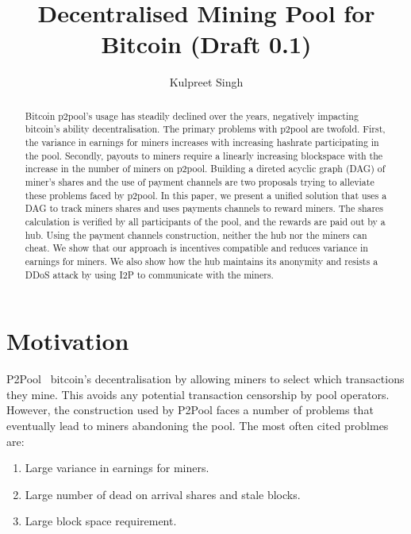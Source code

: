 \documentclass{article}
\title{Decentralised Mining Pool for Bitcoin (Draft 0.1)}
\author{Kulpreet Singh}
\date{}
\begin{document}
\maketitle

\begin{abstract}
  Bitcoin p2pool's usage has steadily declined over the years,
  negatively impacting bitcoin's ability decentralisation. The primary
  problems with p2pool are twofold. First, the variance in earnings
  for miners increases with increasing hashrate participating in the
  pool. Secondly, payouts to miners require a linearly increasing
  blockspace with the increase in the number of miners on
  p2pool. Building a direted acyclic graph (DAG) of miner's shares and
  the use of payment channels are two proposals trying to alleviate
  these problems faced by p2pool. In this paper, we present a unified
  solution that uses a DAG to track miners shares and uses payments
  channels to reward miners. The shares calculation is verified by all
  participants of the pool, and the rewards are paid out by a
  hub. Using the payment channels construction, neither the hub nor
  the miners can cheat. We show that our approach is incentives
  compatible and reduces variance in earnings for miners. We also show
  how the hub maintains its anonymity and resists a DDoS attack by
  using I2P to communicate with the miners.
\end{abstract}
   
\section{Motivation}

P2Pool~\cite{p2pool:wiki} bitcoin's decentralisation by allowing
miners to select which transactions they mine. This avoids any
potential transaction censorship by pool operators. However, the
construction used by P2Pool faces a number of problems that eventually
lead to miners abandoning the pool. The most often cited problmes are:

\begin{enumerate}
\item Large variance in earnings for miners.
\item Large number of dead on arrival shares and stale blocks.
\item Large block space requirement.
\end{enumerate}
\end{document}
